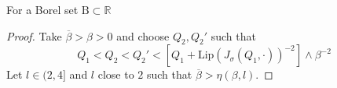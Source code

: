 
\begin{definition}
    For a Borel set $\text{B} \subset \mathbb{R}$
\end{definition}

\begin{proposition}

\end{proposition}
\begin{proof}
    Take $\overline{\beta} > \beta > 0$ and choose $Q_2,Q_2'$ such that
    \[
    Q_1 < Q_2 < Q_2' < [Q_1 +\text{Lip}(J_{\sigma}(Q_1,\cdot))^{-2}] \wedge \beta^{-2}
    \]
    Let $l \in (2,4]$ and $l$ close to $2$ such that $\overline{\beta} > \eta(\beta,l)$. 
\end{proof}


